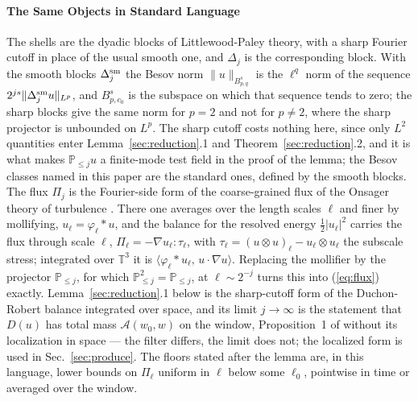 \documentclass[letterpaper,twocolumn]{article}
\newcommand{\T}{\mathbb{T}}
\newcommand{\PP}{\mathbb{P}}
\newcommand{\A}{\mathcal{A}}
\begin{document}
\paragraph*{The Same Objects in Standard Language}

The shells are the dyadic blocks of Littlewood-Paley theory, with a
sharp Fourier cutoff in place of the usual smooth one, and $\Delta_j$ is
the corresponding block. With the smooth blocks $\Delta^{\rm sm}_j$ the
Besov norm $\|u\|_{B^s_{p,q}}$ is the $\ell^q$ norm of the sequence
$2^{js}\|\Delta^{\rm sm}_j u\|_{L^p}$, and $B^s_{p,c_0}$ is the subspace
on which that sequence tends to zero; the sharp blocks give the same
norm for $p = 2$ and not for $p \neq 2$, where the sharp projector is
unbounded on $L^p$. The sharp cutoff costs nothing here, since only
$L^2$ quantities enter Lemma~\ref{sec:reduction}.1 and
Theorem~\ref{sec:reduction}.2, and it is what makes $\PP_{\leq j}u$ a
finite-mode test field in the proof of the lemma; the Besov classes
named in this paper are the standard ones, defined by the smooth blocks. The flux $\Pi_j$ is the Fourier-side form
of the coarse-grained flux of the Onsager theory of turbulence
\cite{Eyi94,ConETit94,DucRob00}. There one averages over the length
scales $\ell$ and finer by mollifying, $u_\ell = \varphi_\ell * u$, and
the balance for the resolved energy $\frac12|u_\ell|^2$ carries the flux
through scale $\ell$, $\Pi_\ell = -\nabla u_\ell : \tau_\ell$, with
$\tau_\ell = (u \otimes u)_\ell - u_\ell \otimes u_\ell$ the subscale
stress; integrated over $\T^3$ it is $\langle \varphi_\ell * u_\ell,\,
u\cdot\nabla u\rangle$. Replacing the mollifier by the projector
$\PP_{\leq j}$, for which $\PP_{\leq j}^2 = \PP_{\leq j}$, at $\ell \sim
2^{-j}$ turns this into (\ref{eq:flux}) exactly. Lemma~\ref{sec:reduction}.1
below is the sharp-cutoff form of the Duchon-Robert balance integrated
over space, and its limit $j \to \infty$ is the statement that $D(u)$
has total mass $\A(w_0,w)$ on the window, Proposition~1 of
\cite{DucRob00} without its localization in space --- the filter differs,
the limit does not; the localized form is used in
Sec.~\ref{sec:produce}. The floors stated after the lemma are, in this
language, lower bounds on $\Pi_\ell$ uniform in $\ell$ below some
$\ell_0$, pointwise in time or averaged over the window.
\end{document}

